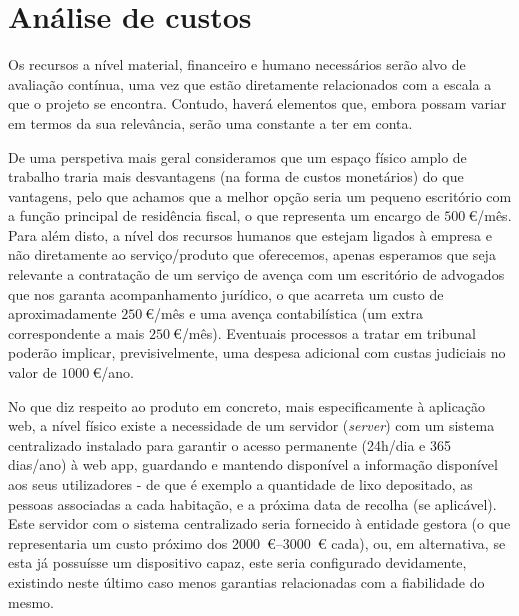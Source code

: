 \documentclass[11pt, a4paper, oneside]{book}
\begin{document}
\section{Análise de custos}

Os recursos a nível material, financeiro e humano necessários serão alvo de avaliação contínua, uma vez que estão diretamente relacionados com a escala a que o projeto se encontra. Contudo, haverá elementos que, embora possam variar em termos da sua relevância, serão uma constante a ter em conta.

De uma perspetiva mais geral consideramos que um espaço físico amplo de trabalho traria mais desvantagens (na forma de custos monetários) do que vantagens, pelo que achamos que a melhor opção seria um pequeno escritório com a função principal de residência fiscal, o que representa um encargo de $\SI{500}{\euro}$/mês.
Para além disto, a nível dos recursos humanos que estejam ligados à empresa e não diretamente ao serviço/produto que oferecemos, apenas esperamos que seja relevante a contratação de um serviço de avença com um escritório de advogados que nos garanta acompanhamento jurídico, o que acarreta um custo de aproximadamente $\SI{250}{\euro}$/mês e uma avença contabilística (um extra correspondente a mais $\SI{250}{\euro}$/mês). Eventuais processos a tratar em tribunal poderão implicar, previsivelmente, uma despesa adicional com custas judiciais no valor de $\SI{1000}{\euro}$/ano.

No que diz respeito ao produto em concreto, mais especificamente à aplicação web, a nível físico existe a necessidade de um servidor (\textit{server}) com um sistema centralizado instalado para garantir o acesso permanente (24h/dia e 365 dias/ano) à web app, guardando e mantendo disponível a informação disponível aos seus utilizadores - de que é exemplo a quantidade de lixo depositado, as pessoas associadas a cada habitação, e a próxima data de recolha (se aplicável). Este servidor com o sistema centralizado seria fornecido à entidade gestora (o que representaria um custo próximo dos \SIrange{2000}{3000}{\euro} cada), ou, em alternativa, se esta já possuísse um dispositivo capaz, este seria configurado devidamente, existindo neste último caso menos garantias relacionadas com a fiabilidade do mesmo.
\end{document}
